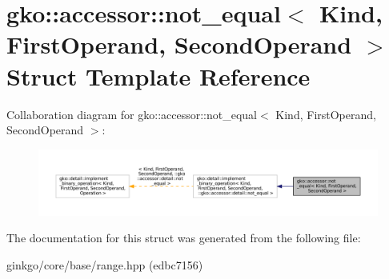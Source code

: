 \hypertarget{structgko_1_1accessor_1_1not__equal}{}\section{gko\+:\+:accessor\+:\+:not\+\_\+equal$<$ Kind, First\+Operand, Second\+Operand $>$ Struct Template Reference}
\label{structgko_1_1accessor_1_1not__equal}


Collaboration diagram for gko\+:\+:accessor\+:\+:not\+\_\+equal$<$ Kind, First\+Operand, Second\+Operand $>$\+:
\nopagebreak
\begin{figure}[H]
\begin{center}
\leavevmode
\includegraphics[width=350pt]{structgko_1_1accessor_1_1not__equal__coll__graph}
\end{center}
\end{figure}


The documentation for this struct was generated from the following file\+:\begin{DoxyCompactItemize}
\item 
ginkgo/core/base/range.\+hpp (edbc7156)\end{DoxyCompactItemize}
